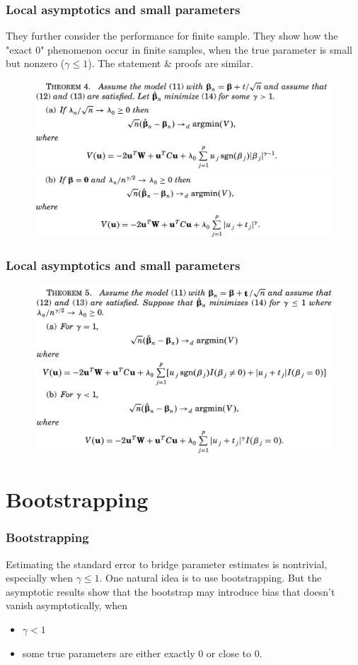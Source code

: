 \documentclass{beamer}
\begin{document}
	\begin{frame}
		\frametitle{Local asymptotics and small parameters}
		They further consider the performance for finite sample. They show how the "exact 0" phenomenon occur in finite samples, when the true parameter is small but nonzero ($\gamma \leq 1$). The statement \& proofs are similar.
		\begin{figure}
			\includegraphics[width=.8\linewidth]{image011.png}
			\includegraphics[width=.8\linewidth]{image012.png}
		\end{figure}
	\end{frame}
	
	\begin{frame}
		\frametitle{Local asymptotics and small parameters}
		\begin{figure}
			\includegraphics[width=1\linewidth]{image013.png}
		\end{figure}
	\end{frame}
	
	\section{Bootstrapping}
	
	\begin{frame}
		\frametitle{Bootstrapping}
		Estimating the standard error to bridge parameter estimates is nontrivial, especially when $\gamma \leq 1$.
		\vspace{\baselineskip}
		One natural idea is to use bootstrapping. But the asymptotic results show that the bootstrap may introduce bias that doesn't vanish asymptotically, when
		\begin{itemize}
			\item 
			$\gamma < 1$ 
			\item
			some true parameters are either exactly 0 or close to 0.
		\end{itemize}
	\end{frame}
	
\end{document}
